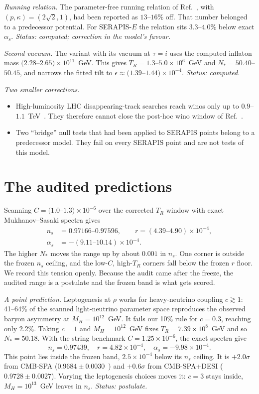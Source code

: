 \documentclass[aps,prd,twocolumn,superscriptaddress,nofootinbib,showkeys]{revtex4-2}
\begin{document}
\emph{Running relation.} The parameter-free running relation of Ref.~\cite{P1}, with $(p,\kappa)=(2\sqrt2,1)$, had been reported as $13$--$16\%$ off. That number belonged to a predecessor potential. For SERAPIS-$E$ the relation sits $3.3$--$4.0\%$ below exact $\alpha_s$. \emph{Status: computed; correction in the model's favour.}

\emph{Second vacuum.} The variant with its vacuum at $\tau=i$ uses the computed inflaton mass $(2.28$--$2.65)\times10^{11}$~GeV. This gives $T_R=1.3$--$5.0\times10^6$~GeV and $N_*=50.40$--$50.45$, and narrows the fitted tilt to $\epsilon\approx(1.39$--$1.44)\times10^{-4}$. \emph{Status: computed.}

\emph{Two smaller corrections.}
\begin{itemize}
\item High-luminosity LHC disappearing-track searches reach winos only up to $0.9$--$1.1$~TeV~\cite{HLLHC}. They therefore cannot close the post-hoc wino window of Ref.~\cite{P3}.
\item Two ``bridge'' null tests that had been applied to SERAPIS points belong to a predecessor model. They fail on every SERAPIS point and are not tests of this model.
\end{itemize}

\section{The audited predictions}
Scanning $C=(1.0$--$1.3)\times10^{-6}$ over the corrected $T_R$ window with exact Mukhanov--Sasaki spectra gives
\begin{align}
n_s&=0.97166\text{--}0.97596,\qquad r=(4.39\text{--}4.90)\times10^{-4},\nonumber\\
\alpha_s&=-(9.11\text{--}10.14)\times10^{-4}.
\end{align}
The higher $N_*$ moves the range up by about $0.001$ in $n_s$. One corner is outside the frozen $n_s$ ceiling, and the low-$C$, high-$T_R$ corners fall below the frozen $r$ floor. We record this tension openly. Because the audit came after the freeze, the audited range is a postulate and the frozen band is what gets scored.

\emph{A point prediction.} Leptogenesis at $\rho$ works for heavy-neutrino coupling $c\gtrsim1$: 41--64\% of the scanned light-neutrino parameter space reproduces the observed baryon asymmetry at $M_H=10^{12}$~GeV. It fails our 10\% rule for $c=0.3$, reaching only 2.2\%. Taking $c=1$ and $M_H=10^{12}$~GeV fixes $T_R=7.39\times10^8$~GeV and so $N_*=50.18$. With the string benchmark $C=1.25\times10^{-6}$, the exact spectra give
\begin{equation}
n_s=0.97439,\quad r=4.82\times10^{-4},\quad \alpha_s=-9.98\times10^{-4}.
\end{equation}
This point lies inside the frozen band, $2.5\times10^{-4}$ below its $n_s$ ceiling. It is $+2.0\sigma$ from CMB-SPA ($0.9684\pm0.0030$~\cite{SPT}) and $+0.6\sigma$ from CMB-SPA+DESI ($0.9728\pm0.0027$). Varying the leptogenesis choices moves it: $c=3$ stays inside, $M_H=10^{13}$~GeV leaves in $n_s$. \emph{Status: postulate.}
\end{document}
